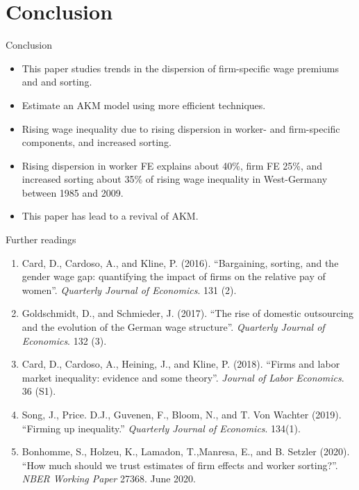\documentclass[notes=show]{beamer}
\begin{document}
\section{Conclusion}

\begin{frame}{Conclusion}
\begin{itemize}
	\item This paper studies trends in the dispersion of firm-specific wage premiums and and sorting. \medskip 
	\item Estimate an AKM model using more efficient techniques. \medskip
	\item Rising wage inequality due to rising dispersion in worker- and firm-specific components, and increased sorting. \medskip
    \item Rising dispersion in worker FE explains about 40\%, firm FE 25\%, and increased sorting about 35\% of rising wage inequality in West-Germany between 1985 and 2009. \medskip
    \item This paper has lead to a revival of AKM.
\end{itemize}
\end{frame}

\begin{frame}{Further readings}
\footnotesize
\begin{enumerate}
\item Card, D., Cardoso, A., and Kline, P. (2016). “Bargaining, sorting, and the gender wage gap: quantifying the impact of firms on the relative pay of women”. \textit{Quarterly Journal of Economics}. 131 (2).
\item Goldschmidt, D., and Schmieder, J. (2017). “The rise of domestic outsourcing and the evolution of the German wage structure”. \textit{Quarterly Journal of Economics}. 132 (3).
\item Card, D., Cardoso, A., Heining, J., and Kline, P. (2018). “Firms and labor market inequality: evidence
and some theory”. \textit{Journal of Labor Economics}. 36 (S1).
\item Song, J., Price. D.J., Guvenen, F., Bloom, N., and T. Von Wachter (2019). “Firming up inequality.” \textit{Quarterly Journal of Economics}. 134(1). 
\item Bonhomme, S., Holzeu, K., Lamadon, T.,Manresa, E., and B. Setzler (2020). “How much should we trust estimates of firm effects and worker sorting?”. \textit{NBER Working Paper} 27368. June 2020. 
\end{enumerate}
\end{frame}
\end{document}
